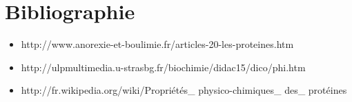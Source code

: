 \section*{Bibliographie}


\begin{itemize}
\item http://www.anorexie-et-boulimie.fr/articles-20-les-proteines.htm
\item http://ulpmultimedia.u-strasbg.fr/biochimie/didac15/dico/phi.htm
\item http://fr.wikipedia.org/wiki/Propriétés\_ physico-chimiques\_ des\_ protéines

\end{itemize}
